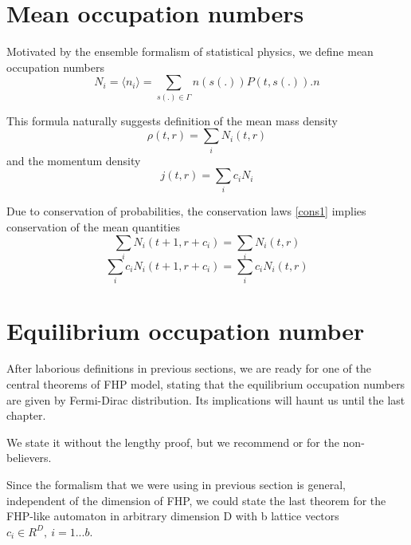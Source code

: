 \section{Mean occupation numbers}
Motivated by the ensemble formalism of statistical physics, we define mean occupation numbers
\begin{equation}
N_i = \langle n_i \rangle = \sum_{s(.) \in \Gamma} n(s(.)) P(t,s(.)) .n
\end{equation}

This formula naturally suggests definition of the mean mass density
\begin{equation}
\rho(t,r) = \sum_i N_i(t,r)
\end{equation}
and the momentum density
\begin{equation}
j(t,r) = \sum_i c_i N_i
\end{equation}

Due to conservation of probabilities, the conservation laws \ref{cons1} implies conservation of the mean quantities
\begin{equation} \label{macro1}
\sum_i N_i(t+1,r+c_i) = \sum_i N_i(t,r) 
\end{equation}
\begin{equation} \label{macro2}
\sum_i c_i N_i(t+1,r+c_i) = \sum_i c_i N_i(t,r)
\end{equation}

\section{Equilibrium occupation number}
After laborious definitions in previous sections, we are ready for one of the central theorems of FHP model, stating that the equilibrium occupation numbers are given by Fermi-Dirac distribution. Its implications will haunt us until the last chapter.

We state it without the lengthy proof, but we recommend \cite{wolf} or \cite{frisch} for the non-believers.

\bigskip
Since the formalism that we were using in previous section is general, independent of the dimension of FHP, we could state the last theorem for the FHP-like automaton in arbitrary dimension D with b lattice vectors $c_i \in R^D,~i=1...b$.

\bigskip

